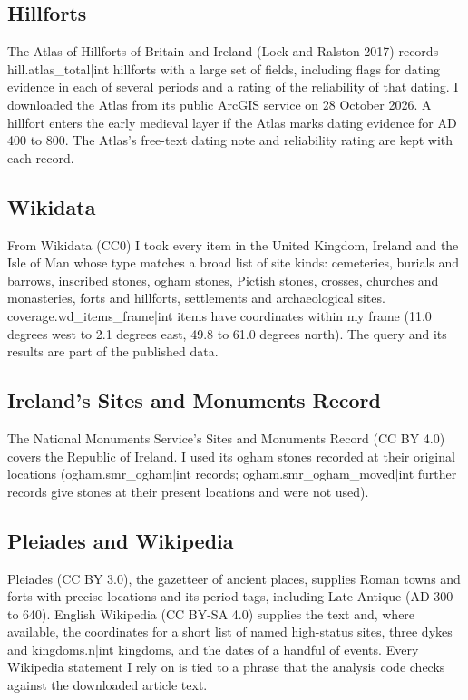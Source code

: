 \documentclass[11pt,a4paper]{article}
\begin{document}
\subsection{Hillforts}

The Atlas of Hillforts of Britain and Ireland (Lock and Ralston 2017) records {{hill.atlas_total|int}} hillforts with a large set of fields, including flags for dating evidence in each of several periods and a rating of the reliability of that dating. I downloaded the Atlas from its public ArcGIS service on 28 October 2026. A hillfort enters the early medieval layer if the Atlas marks dating evidence for AD 400 to 800. The Atlas's free-text dating note and reliability rating are kept with each record.

\subsection{Wikidata}

From Wikidata (CC0) I took every item in the United Kingdom, Ireland and the Isle of Man whose type matches a broad list of site kinds: cemeteries, burials and barrows, inscribed stones, ogham stones, Pictish stones, crosses, churches and monasteries, forts and hillforts, settlements and archaeological sites. {{coverage.wd_items_frame|int}} items have coordinates within my frame (11.0 degrees west to 2.1 degrees east, 49.8 to 61.0 degrees north). The query and its results are part of the published data.

\subsection{Ireland's Sites and Monuments Record}

The National Monuments Service's Sites and Monuments Record (CC BY 4.0) covers the Republic of Ireland. I used its ogham stones recorded at their original locations ({{ogham.smr_ogham|int}} records; {{ogham.smr_ogham_moved|int}} further records give stones at their present locations and were not used).

\subsection{Pleiades and Wikipedia}

Pleiades (CC BY 3.0), the gazetteer of ancient places, supplies Roman towns and forts with precise locations and its period tags, including Late Antique (AD 300 to 640). English Wikipedia (CC BY-SA 4.0) supplies the text and, where available, the coordinates for a short list of named high-status sites, three dykes and {{kingdoms.n|int}} kingdoms, and the dates of a handful of events. Every Wikipedia statement I rely on is tied to a phrase that the analysis code checks against the downloaded article text.
\end{document}
